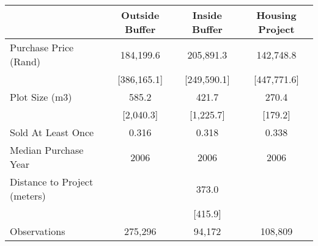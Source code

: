 \begin{tabu}{lccc}
\toprule
 & Outside Buffer & Inside Buffer & Housing Project \\
\midrule
 Purchase Price (Rand)  & 184,199.6  & 205,891.3  & 142,748.8  \\ 
 & [386,165.1]  & [249,590.1]  & [447,771.6]  \\ 
 Plot Size (m3)  & 585.2  & 421.7  & 270.4  \\ 
 & [2,040.3]  & [1,225.7]  & [179.2]  \\ 
 Sold At Least Once  & 0.316  & 0.318  & 0.338  \\ 
 Median Purchase Year  & 2006  & 2006  & 2006  \\ 
 Distance to Project (meters) &  & 373.0  & \\
 &  & [415.9]  & \\
\midrule
 Observations  & 275,296  & 94,172  & 108,809  \\ 
\bottomrule
\end{tabu}
